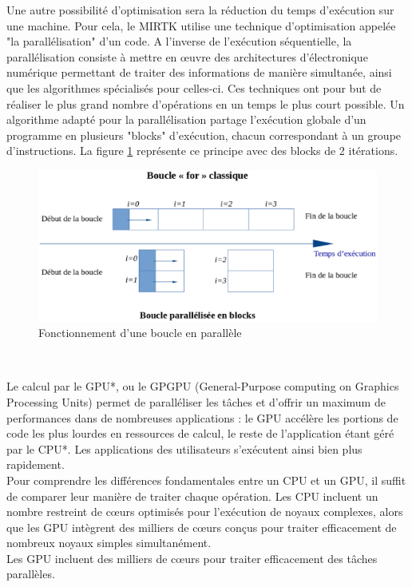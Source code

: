 \documentclass[10pt]{report}
\begin{document}
	Une autre possibilité d'optimisation sera la réduction du temps d'exécution sur une machine. Pour cela, le MIRTK utilise une technique d'optimisation appelée "la parallélisation" d'un code. 
	A l'inverse de l'exécution séquentielle, la parallélisation consiste à mettre en œuvre des architectures d'électronique numérique permettant de traiter des informations de manière simultanée, ainsi que les algorithmes spécialisés pour celles-ci. Ces techniques ont pour but de réaliser le plus grand nombre d'opérations en un temps le plus court possible.
	Un algorithme adapté pour la parallélisation partage l'exécution globale d'un programme en plusieurs "blocks" d'exécution, chacun correspondant à un groupe d'instructions. La figure \ref{Fonctionnement d'une boucle en parallèle} représente ce principe avec des blocks de 2 itérations.
	\begin{figure}[h!]
		\begin{center}
			\includegraphics[width=14cm]{Reports/figures/gfor.eps}	
		\end{center}
		\caption{Fonctionnement d'une boucle en parallèle}
		\label{Fonctionnement d'une boucle en parallèle}
	\end{figure}
	~\par
	Le calcul par le GPU*, ou le GPGPU (General-Purpose computing on Graphics Processing Units) permet de paralléliser les tâches et d'offrir un maximum de performances dans de nombreuses applications : le GPU accélère les portions de code les plus lourdes en ressources de calcul, le reste de l'application étant géré par le CPU*. Les applications des utilisateurs s'exécutent ainsi bien plus rapidement.\\
	Pour comprendre les différences fondamentales entre un CPU et un GPU, il suffit de comparer leur manière de traiter chaque opération. Les CPU incluent un nombre restreint de cœurs optimisés pour l'exécution de noyaux complexes, alors que les GPU intègrent des milliers de cœurs conçus pour traiter efficacement de nombreux noyaux simples simultanément.\\
	Les GPU incluent des milliers de cœurs pour traiter efficacement des tâches parallèles. \\ 
	 
\end{document}
